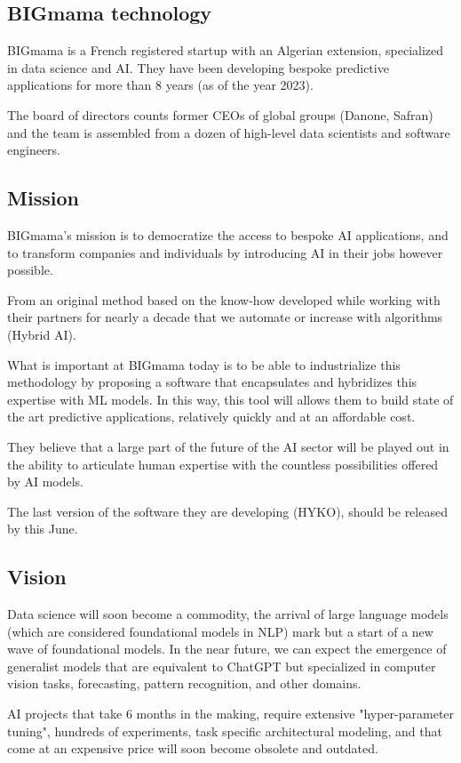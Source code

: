 \documentclass[a4paper,12pt]{article}
\begin{document}
\subsection{BIGmama technology}
BIGmama is a French registered startup with an Algerian extension, specialized in data science and AI. 
They have been developing bespoke predictive applications for more than 8 years (as of the year 2023).

The board of directors counts former CEOs of global groups (Danone, Safran) and the team is assembled from a dozen of high-level data scientists and software engineers.

\subsection{Mission}
BIGmama's mission is to democratize the access to bespoke AI applications, and to transform companies and individuals by introducing AI in their jobs however possible. 

From an original method based on the know-how developed while working with their partners for nearly a decade that we automate or increase with algorithms (Hybrid AI).

What is important at BIGmama today is to be able to industrialize this methodology by proposing a software that encapsulates and hybridizes this expertise with ML models. In this way, this tool will allows them to build state of the art predictive applications, relatively quickly and at an affordable cost.

They believe that a large part of the future of the AI sector will be played out in the ability to articulate human expertise with the countless possibilities offered by AI models.

The last version of the software they are developing (HYKO), should be released by this June.

\subsection{Vision}
Data science will soon become a commodity, the arrival of large language models (which are considered foundational models in NLP) mark but a start of a new wave of foundational models. In the near future, we can expect the emergence of generalist models that are equivalent to ChatGPT but specialized in computer vision tasks, forecasting, pattern recognition, and other domains.

AI projects that take 6 months in the making, require extensive "hyper-parameter tuning", hundreds of experiments, task specific architectural modeling, and that come at an expensive price will soon become obsolete and outdated.
\end{document}
